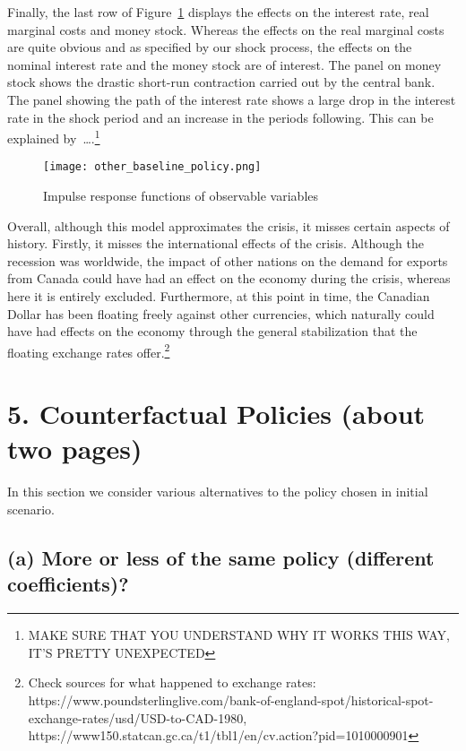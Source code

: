 \documentclass[12pt]{article}
\begin{document}
Finally, the last row of Figure~\ref{fig:other_baseline} displays the effects on the interest rate, real marginal costs and money stock. Whereas the effects on the real marginal costs are quite obvious and as specified by our shock process, the effects on the nominal interest rate and the money stock are of interest. The panel on money stock shows the drastic short-run contraction carried out by the central bank. The panel showing the path of the interest rate shows a large drop in the interest rate in the shock period and an increase in the periods following. This can be explained by\ \dots.\footnote{MAKE SURE THAT YOU UNDERSTAND WHY IT WORKS THIS WAY, IT'S PRETTY UNEXPECTED}   

\begin{figure}[!h]
    \caption{Impulse response functions of observable variables}\label{fig:other_baseline}
    \centering
    \texttt{[image: other\_baseline\_policy.png]}
\end{figure}

Overall, although this model approximates the crisis, it misses certain aspects of history. Firstly, it misses the international effects of the crisis. Although the recession was worldwide, the impact of other nations on the demand for exports from Canada could have had an effect on the economy during the crisis, whereas here it is entirely excluded. Furthermore, at this point in time, the Canadian Dollar has been floating freely against other currencies, which naturally could have had effects on the economy through the general stabilization that the floating exchange rates offer.\footnote{Check sources for what happened to exchange rates: https://www.poundsterlinglive.com/bank-of-england-spot/historical-spot-exchange-rates/usd/USD-to-CAD-1980, \\
https://www150.statcan.gc.ca/t1/tbl1/en/cv.action?pid=1010000901}

\newpage
\section*{5. Counterfactual Policies (about two pages)}
In this section we consider various alternatives to the policy chosen in initial scenario.

\subsection*{(a) More or less of the same policy (different coefficients)?}
\end{document}
